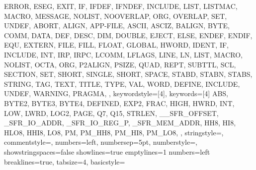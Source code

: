 {{                ERROR, ESEG, EXIT,
                IF, IFDEF, IFNDEF, INCLUDE,
                LIST, LISTMAC,
                MACRO, MESSAGE,
                NOLIST, NOOVERLAP,
                ORG, OVERLAP,
                SET,
                UNDEF, 
                ABORT, ALIGN, APP-FILE, ASCII, ASCIZ, 
                BALIGN, BYTE, 
                COMM, 
                DATA, DEF, DESC, DIM, DOUBLE, 
                EJECT, ELSE, ENDEF, ENDIF, EQU, EXTERN, 
                FILE, FILL, FLOAT, 
                GLOBAL, 
                HWORD,
                IDENT, IF, INCLUDE, INT, IRP, IRPC, 
                LCOMM, LFLAGS, LINE, LN, LIST, 
                MACRO,
                NOLIST, 
                OCTA, ORG, 
                P2ALIGN, PSIZE, 
                QUAD, 
                REPT, 
                SUBTTL, SCL, SECTION, SET, SHORT, 
                SINGLE, SHORT, SPACE, STABD, STABN, 
                STABS, STRING, 
                TAG, TEXT, TITLE, TYPE, 
                VAL, 
                WORD,
                DEFINE, INCLUDE, UNDEF, WARNING, PRAGMA, 
                }, 
%
%
  keywordstyle=[4]\color{arduinoGreen},
  keywords=[4]{  %
                ABS, 
                BYTE2, BYTE3, BYTE4, 
                DEFINED,
                EXP2,
                FRAC, 
                HIGH, HWRD, 
                INT,
                LOW, LWRD, LOG2, 
                PAGE, 
                Q7, Q15, 
                STRLEN,
                __SFR_OFFSET, _SFR_IO_ADDR, _SFR_IO_REG_P,
                _SFR_MEM_ADDR,
                HH8, HI8, HLO8, HHI8,
                LO8,
                PM, PM_HH8, PM_HI8, PM_LO8,
                },      
%
%
  stringstyle=\color{arduinoDarkBlue},    
  commentstyle=\color{arduinoGrey},    
%          
%   
  numbers=left,                    
  numbersep=5pt,                   
  numberstyle=\color{arduinoGrey}, 
  showstringspaces=false
  showlines=true
  emptylines=1
  numbers=left   
%
%
  breaklines=true,                    %
  tabsize=4,         
  basicstyle=\ttfamily  
}
